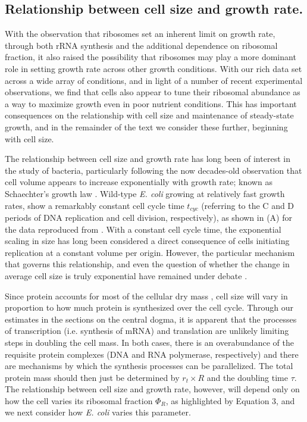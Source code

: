\subsection{Relationship between cell size and growth rate.}
With the observation that ribosomes set an inherent limit on growth rate,
through both rRNA synthesis and the additional dependence on ribosomal fraction,
it also raised the possibility that ribosomes may play a more dominant role in
setting growth rate across other growth conditions. With our rich data set
across a wide array of conditions, and in light of a number of recent
experimental observations, we find that cells also appear to tune their
ribosomal abundance as a way to maximize growth even in poor nutrient
conditions. This has important consequences on the relationship with cell size
and maintenance of steady-state growth, and in the remainder of the text we
consider these further, beginning with cell size.

The relationship between cell size and growth rate has long been of interest in
the study of bacteria, particularly following the now decades-old observation
that cell volume appears to increase exponentially with growth rate; known as
Schaechter's growth law  \citep{schaechter1958, taheriaraghi2015}. Wild-type
\textit{E. coli} growing at relatively fast growth rates, show a remarkably
constant cell cycle time $t_{cyc}$ (referring to the C and D periods of DNA
replication and cell division, respectively), as shown in
(A) for the data reproduced from \citep{si2017}.
With a constant cell cycle time, the exponential scaling in size has long been
considered a direct consequence of cells initiating replication at a constant
volume per origin. However, the particular mechanism that governs this
relationship, and even the question of whether the change in average cell size
is truly exponential  have remained under debate \citep{si2017, harris2018}.

Since protein accounts for most of the cellular dry mass \citep{bremer2008,
basan2015}, cell size will vary in proportion to how much protein is
synthesized over the cell cycle.  Through our estimates in the sections on the
central dogma, it is apparent that the processes of transcription (i.e.
synthesis of mRNA) and translation are unlikely limiting steps in doubling the
cell mass. In both cases, there is an overabundance of the requisite protein
complexes (DNA and RNA polymerase, respectively) and there are mechanisms by
which the synthesis processes can be parallelized. The total protein mass should
then just be determined by $r_t \times R$ and the doubling time
$\tau$. The relationship between cell size and growth rate, however, will
depend only on how the cell varies its ribosomal fraction $\Phi_R$, as highlighted by
Equation 3, and we next consider how \textit{E. coli} varies this parameter.


